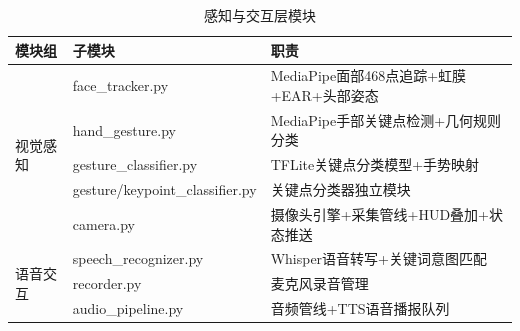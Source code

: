 \documentclass[a4paper]{article}
\begin{document}
\begin{table}[htbp]
  \centering\small
  \caption{感知与交互层模块}
  \label{tab:modules1}
  \begin{tabular}{lll}
  \toprule
  模块组 & 子模块 & 职责 \\
  \midrule
  \multirow{5}{*}{视觉感知} & face\_tracker.py & MediaPipe面部468点追踪+虹膜+EAR+头部姿态 \\
  & hand\_gesture.py & MediaPipe手部关键点检测+几何规则分类 \\
  & gesture\_classifier.py & TFLite关键点分类模型+手势映射 \\
  & gesture/keypoint\_classifier.py & 关键点分类器独立模块 \\
  & camera.py & 摄像头引擎+采集管线+HUD叠加+状态推送 \\
  \midrule
  \multirow{3}{*}{语音交互} & speech\_recognizer.py & Whisper语音转写+关键词意图匹配 \\
  & recorder.py & 麦克风录音管理 \\
  & audio\_pipeline.py & 音频管线+TTS语音播报队列 \\
  \bottomrule
  \end{tabular}
\end{table}
\end{document}
